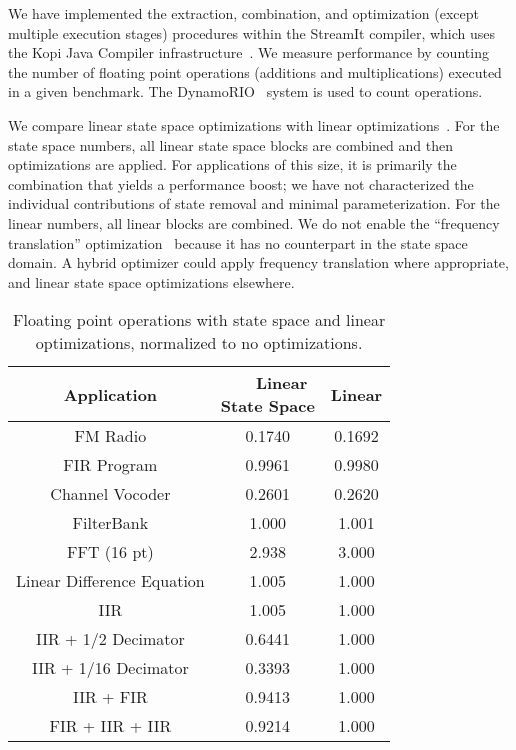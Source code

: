 \label{sec:results}

We have implemented the extraction, combination, and optimization
(except multiple execution stages) procedures within the StreamIt
compiler, which uses the Kopi Java Compiler
infrastructure~\cite{kopi}. We measure performance by counting the
number of floating point operations (additions and multiplications)
executed in a given benchmark. The DynamoRIO~\cite{dynamo} system is
used to count operations.

We compare linear state space optimizations with linear
optimizations~\cite{Lamb}.  For the state space numbers, all linear
state space blocks are combined and then optimizations are applied.
For applications of this size, it is primarily the combination that
yields a performance boost; we have not characterized the individual
contributions of state removal and minimal parameterization.  For the
linear numbers, all linear blocks are combined.  We do not enable the
``frequency translation'' optimization~\cite{Lamb} because it has no
counterpart in the state space domain.  A hybrid optimizer could apply
frequency translation where appropriate, and linear state space
optimizations elsewhere.

\begin{table}[tbp]
\vspace{-12pt}
\small
\begin{center}
\begin{tabular} {c|c|c}
{\bf Application} & \parbox{0.7in}{{\bf ~~~Linear} \\ {\bf State Space}} & {\bf Linear} \\ \hline
FM Radio & 0.1740 & 0.1692 \\
FIR Program &  0.9961 & 0.9980 \\
Channel Vocoder & 0.2601 & 0.2620 \\
FilterBank & 1.000 & 1.001 \\
FFT (16 pt) & 2.938 & 3.000 \\
Linear Difference Equation & 1.005 & 1.000 \\
IIR & 1.005 & 1.000 \\
IIR + 1/2 Decimator & 0.6441 & 1.000 \\
IIR + 1/16 Decimator & 0.3393 & 1.000 \\
IIR + FIR & 0.9413 & 1.000 \\
FIR + IIR + IIR & 0.9214 & 1.000
\end{tabular}
\caption{Floating point operations with state space and linear
optimizations, normalized to no optimizations.\protect\label{tab:results}}
\end{center}
\vspace{-18pt}
\end{table}

